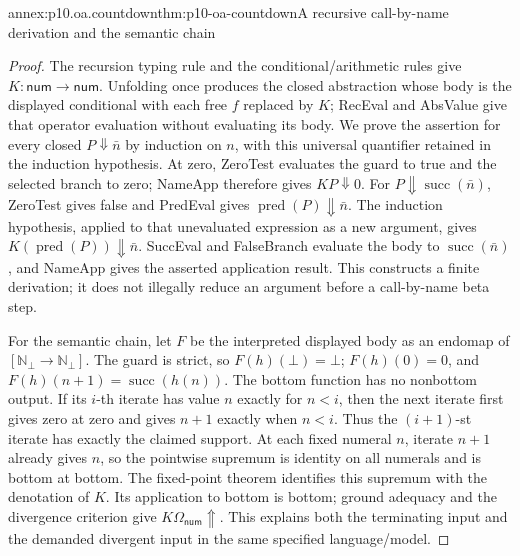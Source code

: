\begin{annexitem}{annex:p10.oa.countdown}{thm:p10-oa-countdown}{A recursive call-by-name derivation and the semantic chain}
\begin{proof}
The recursion typing rule and the conditional/arithmetic rules give
\(K:\mathsf{num}\to\mathsf{num}\). Unfolding once produces the
closed abstraction whose body is the displayed conditional with each
free \(f\) replaced by \(K\); RecEval and AbsValue give that operator
evaluation without evaluating its body.
We prove the assertion for every closed \(P\Downarrow\bar n\) by
induction on \(n\), with this universal quantifier retained in the
induction hypothesis. At zero, ZeroTest evaluates the guard to true and
the selected branch to zero; NameApp therefore gives \(K P\Downarrow0\).
For \(P\Downarrow\operatorname{succ}(\bar n)\), ZeroTest gives false
and PredEval gives \(\operatorname{pred}(P)\Downarrow\bar n\).
The induction hypothesis, applied to that unevaluated expression as a
new argument, gives \(K(\operatorname{pred}(P))\Downarrow\bar n\).
SuccEval and FalseBranch evaluate the body to
\(\operatorname{succ}(\bar n)\), and NameApp gives the asserted
application result. This constructs a finite derivation; it does not
illegally reduce an argument before a call-by-name beta step.

For the semantic chain, let \(F\) be the interpreted displayed body
as an endomap of \([\mathbb N_{\bot}\to\mathbb N_{\bot}]\).
The guard is strict, so \(F(h)(\bot)=\bot\);
\(F(h)(0)=0\), and \(F(h)(n+1)=\operatorname{succ}(h(n))\).
The bottom function has no nonbottom output. If its \(i\)-th iterate
has value \(n\) exactly for \(n<i\), then the next iterate first
gives zero at zero and gives \(n+1\) exactly when \(n<i\). Thus
the \((i+1)\)-st iterate has exactly the claimed support. At each
fixed numeral \(n\), iterate \(n+1\) already gives \(n\), so the
pointwise supremum is identity on all numerals and is bottom at bottom.
The fixed-point theorem identifies this supremum with the denotation
of \(K\). Its application to bottom is bottom; ground adequacy and
the divergence criterion give \(K\Omega_{\mathsf{num}}\Uparrow\).
This explains both the terminating input and the demanded divergent
input in the same specified language/model.
\end{proof}
\end{annexitem}
